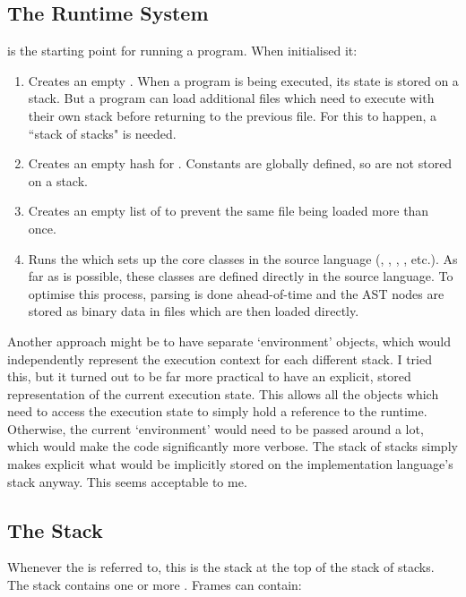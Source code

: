 \newpage
\subsection{The Runtime System}

 is the starting point for running a program. When initialised it:

\begin{enumerate}
  \item Creates an empty . When a program is being executed, its state is stored on a stack. But a program can load additional files which need to execute with their own stack before returning to the previous file. For this to happen, a ``stack of stacks" is needed.
  \item Creates an empty hash for . Constants are globally defined, so are not stored on a stack.
  \item Creates an empty list of  to prevent the same file being loaded more than once.
  \item Runs the  which sets up the core classes in the source language (, , , , etc.). As far as is possible, these classes are defined directly in the source language. To optimise this process, parsing is done ahead-of-time and the AST nodes are stored as binary data in files which are then loaded directly.
\end{enumerate}

Another approach might be to have separate `environment' objects, which would independently represent the execution context for each different stack. I tried this, but it turned out to be far more practical to have an explicit, stored representation of the current execution state. This allows all the objects which need to access the execution state to simply hold a reference to the runtime. Otherwise, the current `environment' would need to be passed around a lot, which would make the code significantly more verbose. The stack of stacks simply makes explicit what would be implicitly stored on the implementation language's stack anyway. This seems acceptable to me.

\subsection{The Stack}

Whenever the  is referred to, this is the stack at the top of the stack of stacks. The stack contains one or more . Frames can contain:

